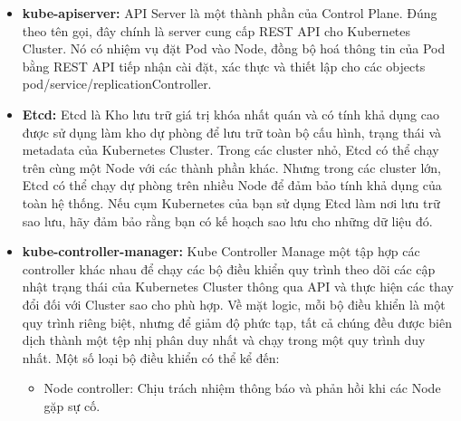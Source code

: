 \documentclass[12pt,a4paper]{report}
\begin{document}
	\hspace{0.3cm}{Các thành phần Control Plane có thể được chạy trên bất kỳ máy nào trong Cluster. Tuy nhiên, để đơn giản, thiết lập tập lệnh thường khởi động tất cả các thành phần Control Plane trên cùng một máy và không chạy các container của người dùng trên máy này. \\}
	
	\hspace{0.3cm}{Đối với cluster nhỏ , Master có thể chạy trên một Node, nhưng trong một cluster lớn, để đảm bảo tính khả dụng (trong tiếng anh là High-Availability) thì Master có thể được chạy trên nhiều Node. (Tính khả dụng có nghĩa là Khi mà một Node trong cluster dừng hoạt động thì hệ thống vẫn duy trì như không có gì xảy ra). Master sẽ bao gồm 5 thành phần chính sau:}
	
	\begin{itemize}
	\item \textbf{kube-apiserver:}
	\smallskip
	\subitem
	API Server là một thành phần của Control Plane. Đúng theo tên gọi, đây chính là server cung cấp REST API cho Kubernetes Cluster. Nó có nhiệm vụ đặt Pod vào Node, đồng bộ hoá thông tin của Pod bằng REST API tiếp nhận cài đặt, xác thực và thiết lập cho các objects pod/service/replicationController.
	
	\item \textbf{Etcd:}
	\smallskip
	\subitem
	Etcd là Kho lưu trữ giá trị khóa nhất quán và có tính khả dụng cao được sử dụng làm kho dự phòng để lưu trữ toàn bộ cấu hình, trạng thái và metadata của Kubernetes Cluster.
	\smallskip
	\subitem Trong các cluster nhỏ, Etcd có thể chạy trên cùng một Node với các thành phần khác. Nhưng trong các cluster lớn, Etcd có thể chạy dự phòng trên nhiều Node để đảm bảo tính khả dụng của toàn hệ thống. Nếu cụm Kubernetes của bạn sử dụng Etcd làm nơi lưu trữ sao lưu, hãy đảm bảo rằng bạn có kế hoạch sao lưu cho những dữ liệu đó.
	
	\item \textbf{kube-controller-manager:}
	\smallskip
	\subitem
	Kube Controller Manage một tập hợp các controller khác nhau để chạy các bộ điều khiển quy trình theo dõi các cập nhật trạng thái của Kubernetes Cluster thông qua API và thực hiện các thay đổi đối với Cluster sao cho phù hợp. 
	\smallskip
	\subitem Về mặt logic, mỗi bộ điều khiển là một quy trình riêng biệt, nhưng để giảm độ phức tạp, tất cả chúng đều được biên dịch thành một tệp nhị phân duy nhất và chạy trong một quy trình duy nhất.
	\smallskip
	\subitem Một số loại bộ điều khiển có thể kể đến:
	\begin{itemize}
		\item Node controller: Chịu trách nhiệm thông báo và phản hồi khi các Node gặp sự cố.


\end{itemize}
\end{itemize}
\end{document}
